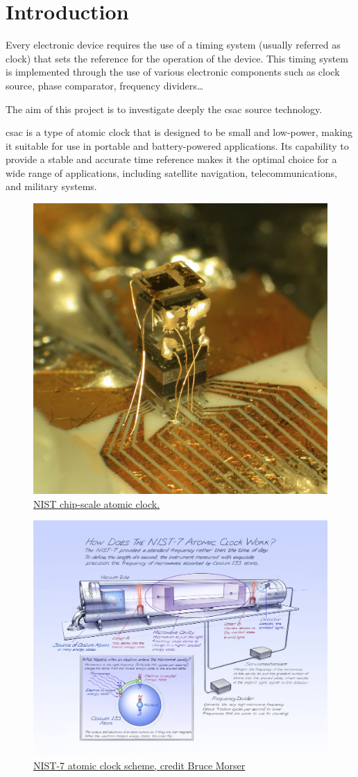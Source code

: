 \section{Introduction}
\label{sec:introduction}

Every electronic device requires the use of a timing system (usually referred as clock) that sets the reference for the operation of the device.
This timing system is implemented through the use of various electronic components such as clock source, phase comparator, frequency dividers\dots

The aim of this project is to investigate deeply the \acrfull{csac} source technology.

\acrshort{csac} is a type of atomic clock that is designed to be small and low-power, making it suitable for use in portable and battery-powered applications.
Its capability to provide a stable and accurate time reference makes it the optimal choice for a wide range of applications, including satellite navigation, telecommunications, and military systems.

\begin{figure}[H]
    \centering
    \includegraphics[width=.5\textwidth]{img/first_atomic_clock}
    \caption{\href{https://www.nist.gov/news-events/news/2004/08/nist-unveils-chip-scale-atomic-clock}{NIST chip-scale atomic clock.}}
\end{figure}

\begin{figure}[H]
    \centering
    \includegraphics[width=.6\textwidth]{img/cesium_atomic_clock_scheme}
    \caption{\href{https://timeandnavigation.si.edu/multimedia-asset/how-does-the-nist-7-atomic-clock-work}{NIST-7 atomic clock scheme, credit Bruce Morser}}
\end{figure}
